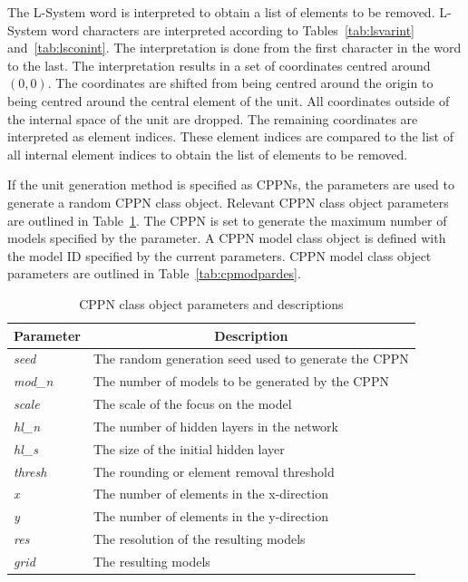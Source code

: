 The L-System word is interpreted to obtain a list of elements to be removed. L-System word characters are interpreted according to Tables~\ref{tab:lsvarint} and~\ref{tab:lsconint}. The interpretation is done from the first character in the word to the last. The interpretation results in a set of coordinates centred around $\left (0,0  \right )$. The coordinates are shifted from being centred around the origin to being centred around the central element of the unit. All coordinates outside of the internal space of the unit are dropped. The remaining coordinates are interpreted as element indices. These element indices are compared to the list of all internal element indices to obtain the list of elements to be removed.

If the unit generation method is specified as CPPNs, the parameters are used to generate a random CPPN class object. Relevant CPPN class object parameters are outlined in Table~\ref{tab:cppardes}. The CPPN is set to generate the maximum number of models specified by the parameter. A CPPN model class object is defined with the model ID specified by the current parameters. CPPN model class object parameters are outlined in Table~\ref{tab:cpmodpardes}.

\begin{table}[H]
\centering
\caption{CPPN class object parameters and descriptions}
\label{tab:cppardes}
\begin{tabular}{@{}ll@{}}
\toprule
\multicolumn{1}{c}{\textbf{Parameter}} & \multicolumn{1}{c}{\textbf{Description}}             \\ \midrule
\textit{seed}                          & The random generation seed used to generate the CPPN \\
\textit{mod\_n}                        & The number of models to be generated by the CPPN     \\
\textit{scale}                         & The scale of the focus on the model                  \\
\textit{hl\_n}                         & The number of hidden layers in the network           \\
\textit{hl\_s}                         & The size of the initial hidden layer                 \\
\textit{thresh}                        & The rounding or element removal threshold            \\
\textit{x}                             & The number of elements in the x-direction            \\
\textit{y}                             & The number of elements in the y-direction            \\
\textit{res}                           & The resolution of the resulting models               \\
\textit{grid}                          & The resulting models                                 \\ \bottomrule
\end{tabular}
\end{table}

